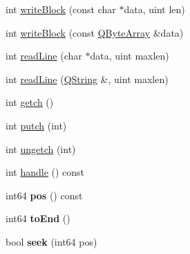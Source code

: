 \begin{DoxyCompactItemize}
\item 
int \hyperlink{class_q_file_ab5cb5ccbfabc30d93dd26f1854258ee6}{write\-Block} (const char $\ast$data, uint len)
\item 
int \hyperlink{class_q_file_ac2c00524f1222398355427621c705236}{write\-Block} (const \hyperlink{class_q_array}{Q\-Byte\-Array} \&data)
\item 
int \hyperlink{class_q_file_aa360b2281966b05ff25504cf03046c90}{read\-Line} (char $\ast$data, uint maxlen)
\item 
int \hyperlink{class_q_file_a285e6c2c0f4c9bdea6e9e98cd61e10a9}{read\-Line} (\hyperlink{class_q_string}{Q\-String} \&, uint maxlen)
\item 
int \hyperlink{class_q_file_a160f6d2893bb6b89ab3ad5d863c20e3d}{getch} ()
\item 
int \hyperlink{class_q_file_a9e6c0b0babdacae50c15aa246803e771}{putch} (int)
\item 
int \hyperlink{class_q_file_a574c1d3f303340347106bf2cdaad5568}{ungetch} (int)
\item 
int \hyperlink{class_q_file_a7fe98a0bd164ae0a806c2a87bb956bc3}{handle} () const 
\item 
\hypertarget{class_q_file_af9f2e0fc2971f8c517ce322c5bce4805}{int64 {\bfseries pos} () const }\label{class_q_file_af9f2e0fc2971f8c517ce322c5bce4805}

\item 
\hypertarget{class_q_file_a3e8d278cece4bc2ab53ac05e1cb74103}{int64 {\bfseries to\-End} ()}\label{class_q_file_a3e8d278cece4bc2ab53ac05e1cb74103}

\item 
\hypertarget{class_q_file_a0d12eec06745bfbf5249f984717fab38}{bool {\bfseries seek} (int64 pos)}\label{class_q_file_a0d12eec06745bfbf5249f984717fab38}

\end{DoxyCompactItemize}
